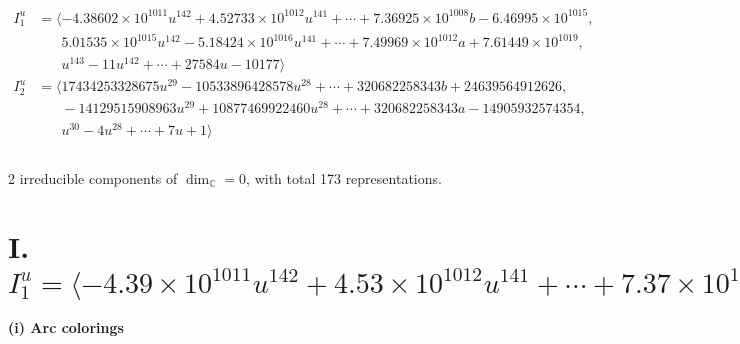 \documentclass[1p]{elsarticle_modified}
\theoremstyle{definition}
\begin{document}
\begin{align*}
I^u_{1}&=\langle 
-4.38602\times10^{1011} u^{142}+4.52733\times10^{1012} u^{141}+\cdots+7.36925\times10^{1008} b-6.46995\times10^{1015},\\
\phantom{I^u_{1}}&\phantom{= \langle  }5.01535\times10^{1015} u^{142}-5.18424\times10^{1016} u^{141}+\cdots+7.49969\times10^{1012} a+7.61449\times10^{1019},\\
\phantom{I^u_{1}}&\phantom{= \langle  }u^{143}-11 u^{142}+\cdots+27584 u-10177\rangle \\
I^u_{2}&=\langle 
17434253328675 u^{29}-10533896428578 u^{28}+\cdots+320682258343 b+24639564912626,\\
\phantom{I^u_{2}}&\phantom{= \langle  }-14129515908963 u^{29}+10877469922460 u^{28}+\cdots+320682258343 a-14905932574354,\\
\phantom{I^u_{2}}&\phantom{= \langle  }u^{30}-4 u^{28}+\cdots+7 u+1\rangle \\
\\
\end{align*}
\raggedright * 2 irreducible components of $\dim_{\mathbb{C}}=0$, with total 173 representations.\\
\newpage
\renewcommand{\arraystretch}{1}
\centering \section*{I. $I^u_{1}= \langle -4.39\times10^{1011} u^{142}+4.53\times10^{1012} u^{141}+\cdots+7.37\times10^{1008} b-6.47\times10^{1015},\;5.02\times10^{1015} u^{142}-5.18\times10^{1016} u^{141}+\cdots+7.50\times10^{1012} a+7.61\times10^{1019},\;u^{143}-11 u^{142}+\cdots+27584 u-10177 \rangle$}
\flushleft \textbf{(i) Arc colorings}\\
\end{document}
